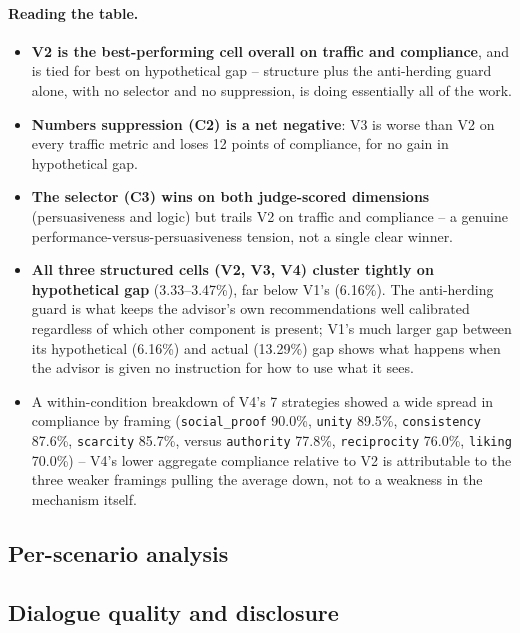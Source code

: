 \paragraph{Reading the table.}
\begin{itemize}
  \item \textbf{V2 is the best-performing cell overall on traffic and compliance}, and is tied for best on hypothetical gap -- structure plus the anti-herding guard alone, with no selector and no suppression, is doing essentially all of the work.
  \item \textbf{Numbers suppression (C2) is a net negative}: V3 is worse than V2 on every traffic metric and loses 12 points of compliance, for no gain in hypothetical gap.
  \item \textbf{The selector (C3) wins on both judge-scored dimensions} (persuasiveness and logic) but trails V2 on traffic and compliance -- a genuine performance-versus-persuasiveness tension, not a single clear winner.
  \item \textbf{All three structured cells (V2, V3, V4) cluster tightly on hypothetical gap} (3.33--3.47\%), far below V1's (6.16\%). The anti-herding guard is what keeps the advisor's own recommendations well calibrated regardless of which other component is present; V1's much larger gap between its hypothetical (6.16\%) and actual (13.29\%) gap shows what happens when the advisor is given no instruction for how to use what it sees.
  \item A within-condition breakdown of V4's 7 strategies showed a wide spread in compliance by framing (\texttt{social\_proof} 90.0\%, \texttt{unity} 89.5\%, \texttt{consistency} 87.6\%, \texttt{scarcity} 85.7\%, versus \texttt{authority} 77.8\%, \texttt{reciprocity} 76.0\%, \texttt{liking} 70.0\%) -- V4's lower aggregate compliance relative to V2 is attributable to the three weaker framings pulling the average down, not to a weakness in the mechanism itself. 
\end{itemize}

\subsection{Per-scenario analysis}

\subsection{Dialogue quality and disclosure}
